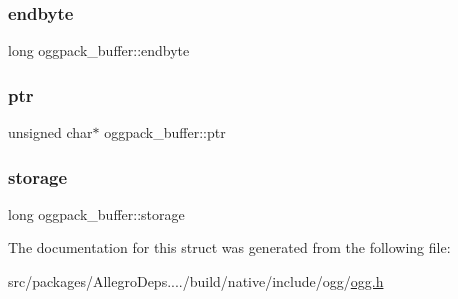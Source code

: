 \mbox{\label{structoggpack__buffer_a416200dd77da3603dce3913826d74207}} 
\subsubsection{\texorpdfstring{endbyte}{endbyte}}
{\footnotesize\ttfamily long oggpack\+\_\+buffer\+::endbyte}

\mbox{\label{structoggpack__buffer_a479984d9646e0fba6da8aff21e5c3b64}} 
\subsubsection{\texorpdfstring{ptr}{ptr}}
{\footnotesize\ttfamily unsigned char$\ast$ oggpack\+\_\+buffer\+::ptr}

\mbox{\label{structoggpack__buffer_a1eea2afb662c8080a902d224773fee4e}} 
\subsubsection{\texorpdfstring{storage}{storage}}
{\footnotesize\ttfamily long oggpack\+\_\+buffer\+::storage}



The documentation for this struct was generated from the following file\+:\begin{DoxyCompactItemize}
\item 
src/packages/\+Allegro\+Deps..../build/native/include/ogg/\hyperlink{ogg_8h}{ogg.\+h}\end{DoxyCompactItemize}
